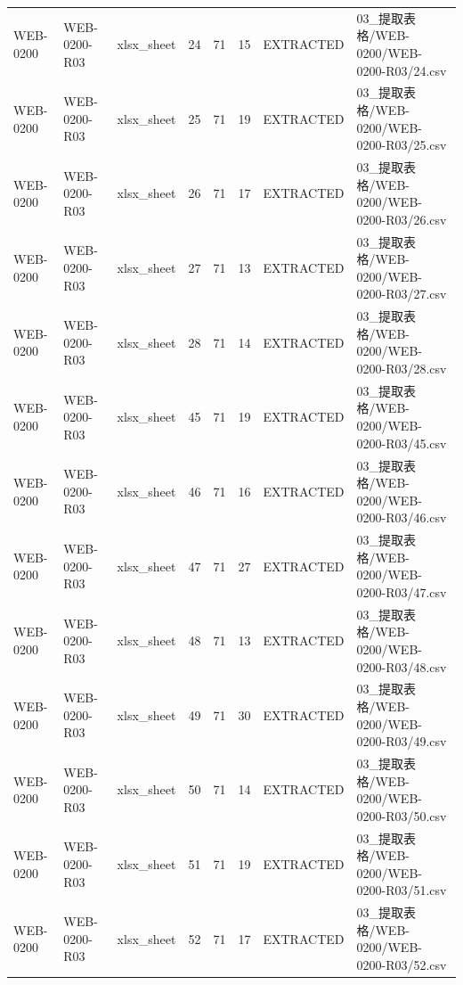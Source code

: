 \begin{landscape}
\begin{longtable}{p{1.8cm}p{2.2cm}p{3.1cm}p{4.7cm}p{1.3cm}p{1.3cm}p{3.0cm}p{5.3cm}}
WEB-0200 & WEB-0200-R03 & xlsx\_\allowbreak{}sheet & 24 & 71 & 15 & EXTRACTED & 03\_\allowbreak{}提取表格/\allowbreak{}WEB-0200/\allowbreak{}WEB-0200-R03/\allowbreak{}24.csv\\
WEB-0200 & WEB-0200-R03 & xlsx\_\allowbreak{}sheet & 25 & 71 & 19 & EXTRACTED & 03\_\allowbreak{}提取表格/\allowbreak{}WEB-0200/\allowbreak{}WEB-0200-R03/\allowbreak{}25.csv\\
WEB-0200 & WEB-0200-R03 & xlsx\_\allowbreak{}sheet & 26 & 71 & 17 & EXTRACTED & 03\_\allowbreak{}提取表格/\allowbreak{}WEB-0200/\allowbreak{}WEB-0200-R03/\allowbreak{}26.csv\\
WEB-0200 & WEB-0200-R03 & xlsx\_\allowbreak{}sheet & 27 & 71 & 13 & EXTRACTED & 03\_\allowbreak{}提取表格/\allowbreak{}WEB-0200/\allowbreak{}WEB-0200-R03/\allowbreak{}27.csv\\
WEB-0200 & WEB-0200-R03 & xlsx\_\allowbreak{}sheet & 28 & 71 & 14 & EXTRACTED & 03\_\allowbreak{}提取表格/\allowbreak{}WEB-0200/\allowbreak{}WEB-0200-R03/\allowbreak{}28.csv\\
WEB-0200 & WEB-0200-R03 & xlsx\_\allowbreak{}sheet & 45 & 71 & 19 & EXTRACTED & 03\_\allowbreak{}提取表格/\allowbreak{}WEB-0200/\allowbreak{}WEB-0200-R03/\allowbreak{}45.csv\\
WEB-0200 & WEB-0200-R03 & xlsx\_\allowbreak{}sheet & 46 & 71 & 16 & EXTRACTED & 03\_\allowbreak{}提取表格/\allowbreak{}WEB-0200/\allowbreak{}WEB-0200-R03/\allowbreak{}46.csv\\
WEB-0200 & WEB-0200-R03 & xlsx\_\allowbreak{}sheet & 47 & 71 & 27 & EXTRACTED & 03\_\allowbreak{}提取表格/\allowbreak{}WEB-0200/\allowbreak{}WEB-0200-R03/\allowbreak{}47.csv\\
WEB-0200 & WEB-0200-R03 & xlsx\_\allowbreak{}sheet & 48 & 71 & 13 & EXTRACTED & 03\_\allowbreak{}提取表格/\allowbreak{}WEB-0200/\allowbreak{}WEB-0200-R03/\allowbreak{}48.csv\\
WEB-0200 & WEB-0200-R03 & xlsx\_\allowbreak{}sheet & 49 & 71 & 30 & EXTRACTED & 03\_\allowbreak{}提取表格/\allowbreak{}WEB-0200/\allowbreak{}WEB-0200-R03/\allowbreak{}49.csv\\
WEB-0200 & WEB-0200-R03 & xlsx\_\allowbreak{}sheet & 50 & 71 & 14 & EXTRACTED & 03\_\allowbreak{}提取表格/\allowbreak{}WEB-0200/\allowbreak{}WEB-0200-R03/\allowbreak{}50.csv\\
WEB-0200 & WEB-0200-R03 & xlsx\_\allowbreak{}sheet & 51 & 71 & 19 & EXTRACTED & 03\_\allowbreak{}提取表格/\allowbreak{}WEB-0200/\allowbreak{}WEB-0200-R03/\allowbreak{}51.csv\\
WEB-0200 & WEB-0200-R03 & xlsx\_\allowbreak{}sheet & 52 & 71 & 17 & EXTRACTED & 03\_\allowbreak{}提取表格/\allowbreak{}WEB-0200/\allowbreak{}WEB-0200-R03/\allowbreak{}52.csv\\

\end{longtable}
\end{landscape}
